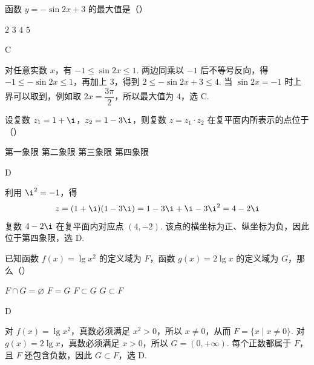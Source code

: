 \begin{problem}

函数 \(y=-\sin 2x+3\) 的最大值是（\quad）

\choices
    {\(2\)}
    {\(3\)}
    {\(4\)}
    {\(5\)}

\begin{answer}
C
\end{answer}

\begin{solution}
对任意实数 \(x\)，有 \(-1\leqslant\sin 2x\leqslant1\). 两边同乘以 \(-1\) 后不等号反向，得 \(-1\leqslant-\sin 2x\leqslant1\)，再加上 \(3\)，得到 \(2\leqslant-\sin 2x+3\leqslant4\). 当 \(\sin 2x=-1\) 时上界可以取到，例如取 \(2x=\dfrac{3\pi}{2}\)，所以最大值为 \(4\)，选 C.
\end{solution}
\end{problem}

\begin{problem}

设复数 \(z_1=1+\i\)，\(z_2=1-3\i\)，则复数 \(z=z_1\cdot z_2\) 在复平面内所表示的点位于（\quad）

\choices
    {第一象限}
    {第二象限}
    {第三象限}
    {第四象限}

\begin{answer}
D
\end{answer}

\begin{solution}
利用 \(\i^2=-1\)，得
\[
z=(1+\i)(1-3\i)=1-3\i+\i-3\i^2=4-2\i
\]
复数 \(4-2\i\) 在复平面内对应点 \((4,-2)\). 该点的横坐标为正、纵坐标为负，因此位于第四象限，选 D.
\end{solution}
\end{problem}

\begin{problem}

已知函数 \(f(x)=\lg x^2\) 的定义域为 \(F\)，函数 \(g(x)=2\lg x\) 的定义域为 \(G\)，那么（\quad）

\choices
    {\(F \cap G = \varnothing\)}
    {\(F = G\)}
    {\(F \subset G\)}
    {\(G \subset F\)}

\begin{answer}
D
\end{answer}

\begin{solution}
对 \(f(x)=\lg x^2\)，真数必须满足 \(x^2>0\)，所以 \(x\neq0\)，从而 \(F=\{x\mid x\neq0\}\). 对 \(g(x)=2\lg x\)，真数必须满足 \(x>0\)，所以 \(G=(0,+\infty)\). 每个正数都属于 \(F\)，且 \(F\) 还包含负数，因此 \(G\subset F\)，选 D.
\end{solution}
\end{problem}

